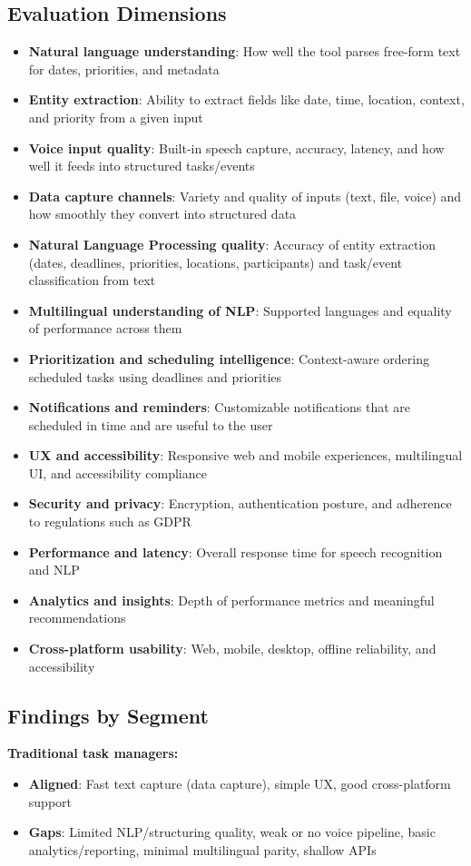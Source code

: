 \documentclass[12pt,a4paper]{article}
\begin{document}
\subsection{Evaluation Dimensions}
\begin{itemize}
    \item \textbf{Natural language understanding}: How well the tool parses free-form text for dates, priorities, and metadata
    \item \textbf{Entity extraction}: Ability to extract fields like date, time, location, context, and priority from a given input
    \item \textbf{Voice input quality}: Built-in speech capture, accuracy, latency, and how well it feeds into structured tasks/events
    \item \textbf{Data capture channels}: Variety and quality of inputs (text, file, voice) and how smoothly they convert into structured data
    \item \textbf{Natural Language Processing quality}: Accuracy of entity extraction (dates, deadlines, priorities, locations, participants) and task/event classification from text
    \item \textbf{Multilingual understanding of NLP}: Supported languages and equality of performance across them
    \item \textbf{Prioritization and scheduling intelligence}: Context-aware ordering scheduled tasks using deadlines and priorities
    \item \textbf{Notifications and reminders}: Customizable notifications that are scheduled in time and are useful to the user
    \item \textbf{UX and accessibility}: Responsive web and mobile experiences, multilingual UI, and accessibility compliance
    \item \textbf{Security and privacy}: Encryption, authentication posture, and adherence to regulations such as GDPR
    \item \textbf{Performance and latency}: Overall response time for speech recognition and NLP
    \item \textbf{Analytics and insights}: Depth of performance metrics and meaningful recommendations
    \item \textbf{Cross-platform usability}: Web, mobile, desktop, offline reliability, and accessibility
\end{itemize}

\subsection{Findings by Segment}
\textbf{Traditional task managers:}
\begin{itemize}
    \renewcommand\labelitemi{-}
    \item \textbf{Aligned}: Fast text capture (data capture), simple UX, good cross-platform support
    \item \textbf{Gaps}: Limited NLP/structuring quality, weak or no voice pipeline, basic analytics/reporting, minimal multilingual parity, shallow APIs
\end{itemize}
\end{document}
